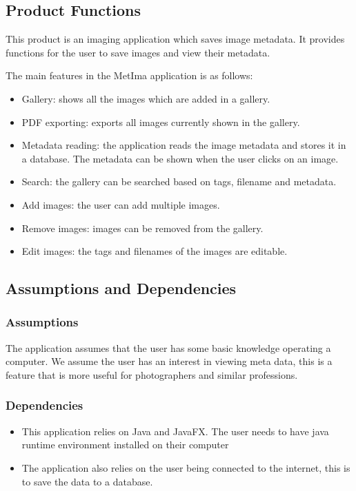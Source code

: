 \subsection{Product Functions}
This product is an imaging application which saves image metadata. It provides functions for the user to save images and view their metadata.

The main features in the MetIma application is as follows:
\begin{itemize}
    \item Gallery: shows all the images which are added in a gallery.
    \item PDF exporting: exports all images currently shown in the gallery.
    \item Metadata reading: the application reads the image metadata and stores it in a database. The metadata can be shown when the user clicks on an image.
    \item Search: the gallery can be searched based on tags, filename and metadata.
    \item Add images: the user can add multiple images.
    \item Remove images: images can be removed from the gallery.
    \item Edit images: the tags and filenames of the images are editable.
\end{itemize}

\subsection{Assumptions and Dependencies}

\subsubsection{Assumptions}
The application assumes that the user has some basic knowledge operating a computer. We assume the user has an interest in viewing meta data, this is a feature that is more useful for photographers and similar professions. 

\subsubsection{Dependencies}
\begin{itemize}
    \item This application relies on Java and JavaFX. The user needs to have java runtime environment installed on their computer
        \item The application also relies on the user being connected to the internet, this is to save the data to a database.
\end{itemize}
